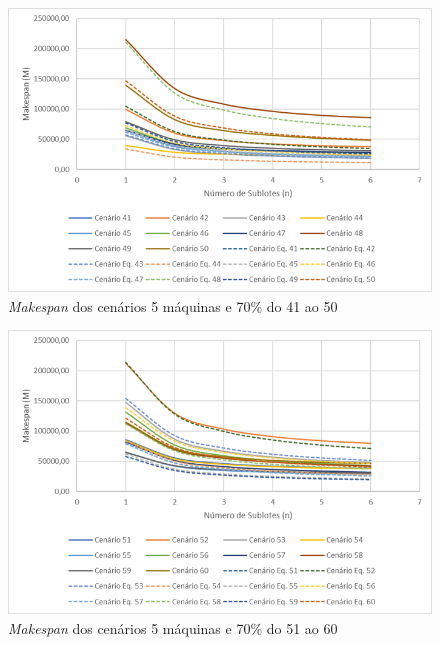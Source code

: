 \begin{figure}[H]
    \centering
    \includegraphics[width=13cm]{Apendices/Figuras/05m70_41-50}
    \caption{\textit{Makespan} dos cenários 5 máquinas e 70\% do 41 ao 50}
    \label{fig:05m70_41-50}
\end{figure}

\begin{figure}[H]
    \centering
    \includegraphics[width=13cm]{Apendices/Figuras/05m70_51-60}
    \caption{\textit{Makespan} dos cenários 5 máquinas e 70\% do 51 ao 60}
    \label{fig:05m70_51-60}
\end{figure}

